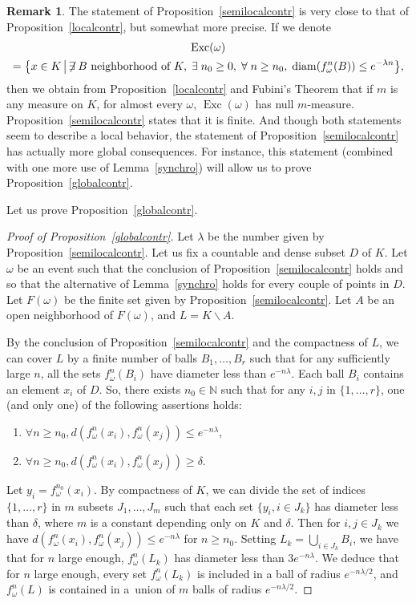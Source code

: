 \documentclass[10pt]{amsart}
\theoremstyle{definition}\newtheorem{defi}[theo]{Definition}\newtheorem{rema}[theo]{Remark}\newtheorem{exam}[theo]{Example}\newtheorem{exem}[theo]{Example}\newtheorem{nota}[theo]{Notation}
\DeclareMathOperator{\Exc}{Exc}
\DeclareMathOperator{\diam}{diam}
\newcommand{\N}{\mathbb{N}}
\let\originalleft\left
\let\originalright\right
\renewcommand{\left}{\mathopen{}\mathclose\bgroup\originalleft}
\renewcommand{\right}{\aftergroup\egroup\originalright}
\let\oldexists\exists
\renewcommand*{\exists}{\mathrel{\oldexists}}
\let\oldforall\forall
\renewcommand*{\forall}{\mathrel{\oldforall}}
\begin{document}
\begin{rema}
The statement of Proposition~\ref{semilocalcontr} is very close to that of Proposition~\ref{localcontr}, but somewhat more precise. If we denote
\begin{multline}
\Exc(\omega)\\
=\left\{x\in K\,\middle|\,\not\exists B \text{ neighborhood of } K, \;\exists n_0 \geq 0,\;\forall n\geq n_0,\; \diam(f_\omega^n(B)) \leq e^{-\lambda n}\right\},
\end{multline}
then we obtain from Proposition~\ref{localcontr} and Fubini's Theorem that if $m$ is any measure on $K$, for almost every $\omega$, $\Exc(\omega)$ has null $m$-measure. Proposition~\ref{semilocalcontr} states that it is finite. And though both statements seem to describe a local behavior, the statement of Proposition~\ref{semilocalcontr} has actually more global consequences. For instance, this statement (combined with one more use of Lemma~\ref{synchro}) will allow us to prove Proposition~\ref{globalcontr}.
\end{rema}


Let us prove Proposition~\ref{globalcontr}.

\begin{proof}[Proof of Proposition~\ref{globalcontr}]
Let $\lambda$ be the number given by Proposition~\ref{semilocalcontr}. Let us fix a countable and dense subset $D$ of $K$. Let $\omega$ be an event such that the conclusion of Proposition~\ref{semilocalcontr} holds and so that the alternative of Lemma~\ref{synchro} holds for every couple of points in $D$. Let $F(\omega)$ be the finite set given by Proposition~\ref{semilocalcontr}. Let $A$ be an open neighborhood of $F(\omega)$, and $L=K\backslash A$.

By the conclusion of Proposition~\ref{semilocalcontr} and the compactness of $L$, we can cover $L$ by a finite number of balls $B_1,\dots,B_r$ such that for any sufficiently large $n$, all the sets $f_\omega^n(B_i)$ have diameter less than $e^{-n\lambda}$. Each ball $B_i$ contains an element $x_i$ of $D$. So, there exists $n_0\in\N$ such that for any $i,j$ in $\{1,\dots,r\}$, one (and only one) of the following assertions holds:
\begin{enumerate}
\item $\forall n\geq n_0, d(f_\omega^n(x_i),f_\omega^n(x_j))\leq e^{-n\lambda}$,
\item $\forall n\geq n_0, d(f_\omega^n(x_i),f_\omega^n(x_j))\geq \delta$.
\end{enumerate}
Let $y_i=f_\omega^{n_0}(x_i)$. By compactness of $K$, we can divide the set of indices $\{1,\dots,r\}$ in $m$ subsets $J_1,\dots,J_m$ such that each set $\{y_i,i\in J_k\}$ has diameter less than $\delta$, where $m$ is a constant depending only on $K$ and $\delta$. Then for $i,j\in J_k$ we have $d(f_\omega^n(x_i),f_\omega^n(x_j))\leq e^{-n\lambda}$ for $n\geq n_0$. Setting $L_k=\bigcup_{i\in J_k} B_i$, we have that for $n$ large enough, $f_\omega^n(L_k)$ has diameter less than $3e^{-n\lambda}$. We deduce that for $n$ large enough, every set $f_\omega^n(L_k)$ is included in a ball of radius $e^{-n\lambda/2}$, and $f_\omega^n(L)$ is contained in a~union of $m$ balls of radius $e^{-n\lambda/2}$.
\end{proof}
\end{document}
